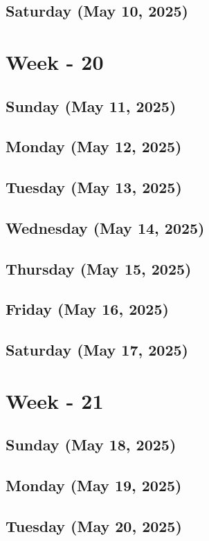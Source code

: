 \subsection*{Saturday (May 10, 2025)}

\section{Week - 20}
\subsection*{Sunday (May 11, 2025)}
\subsection*{Monday (May 12, 2025)}
\subsection*{Tuesday (May 13, 2025)}
\subsection*{Wednesday (May 14, 2025)}
\subsection*{Thursday (May 15, 2025)}
\subsection*{Friday (May 16, 2025)}
\subsection*{Saturday (May 17, 2025)}

\section{Week - 21}
\subsection*{Sunday (May 18, 2025)}
\subsection*{Monday (May 19, 2025)}
\subsection*{Tuesday (May 20, 2025)}
